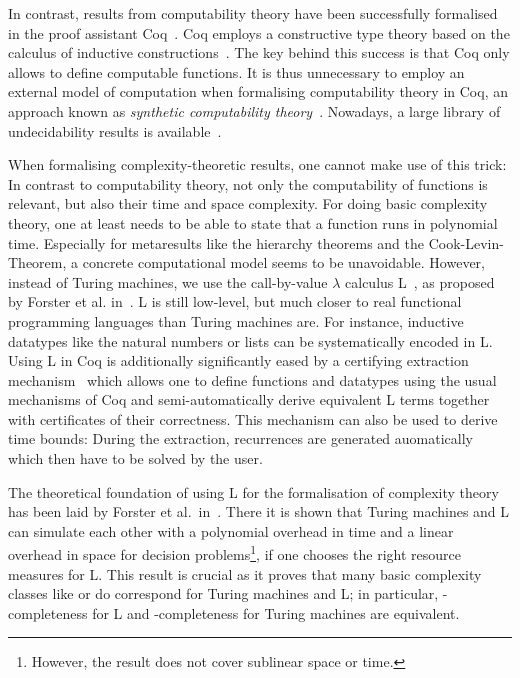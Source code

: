 In contrast, results from computability theory have been successfully formalised in the proof assistant Coq~\cite{coqweb}. 
Coq employs a constructive type theory based on the calculus of inductive constructions~\cite{iclnotes}. The key behind this success is that Coq only allows to define computable functions. 
It is thus unnecessary to employ an external model of computation when formalising computability theory in Coq, an approach known as \textit{synthetic computability theory}~\cite{ForsterEtAl:2018:On-Synthetic-Undecidability}. 
Nowadays, a large library of undecidability results is available~\cite{coq_undec}. 

When formalising complexity-theoretic results, one cannot make use of this trick: In contrast to computability theory, not only the computability of functions is relevant, but also their time and space complexity. For doing basic complexity theory, one at least needs to be able to state that a function runs in polynomial time.
Especially for metaresults like the hierarchy theorems and the Cook-Levin-Theorem, a concrete computational model seems to be unavoidable.
However, instead of Turing machines, we use the call-by-value $\lambda$ calculus L~\cite{ForsterSmolka:2017:L-Computability}, as proposed by Forster et al. in~\cite{ForsterEtAl:2019:VerifiedTMs}. L is still low-level, but much closer to real functional programming languages than Turing machines are. For instance, inductive datatypes like the natural numbers or lists can be systematically encoded in L.
Using L in Coq is additionally significantly eased by a certifying extraction mechanism~\cite{ForsterKunze:2019:Certifying-extraction} which allows one to define functions and datatypes using the usual mechanisms of Coq and semi-automatically derive equivalent L terms together with certificates of their correctness. This mechanism can also be used to derive time bounds: During the extraction, recurrences are generated auomatically which then have to be solved by the user. 

The theoretical foundation of using L for the formalisation of complexity theory has been laid by Forster et al.\ in~\cite{ForsterKunzeRoth:2019:wcbv-Reasonable}. There it is shown that Turing machines and L can simulate each other with a polynomial overhead in time and a linear overhead in space for decision problems\footnote{However, the result does not cover sublinear space or time.}, if one chooses the right resource measures for L.
This result is crucial as it proves that many basic complexity classes like \NP{} or \PC{} do correspond for Turing machines and L; in particular, \NP{}-completeness for L and \NP{}-completeness for Turing machines are equivalent.

